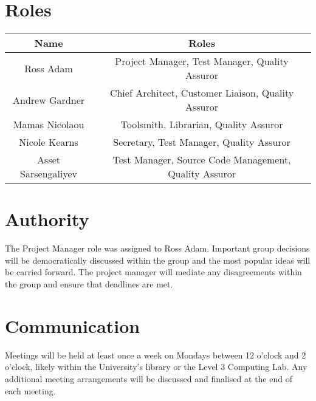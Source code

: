\documentclass{l3deliverable}
\begin{document}
{%

\section{Roles}

\begin{center}{
\begin{tabular}{|c|c|}
\hline \textbf{Name} &\textbf{Roles}\\ 
\hline Ross Adam & Project Manager, Test Manager, Quality Assuror\\ 
\hline Andrew Gardner & Chief Architect, Customer Liaison, Quality Assuror  \\ 
\hline Mamas Nicolaou & Toolsmith, Librarian, Quality Assuror\\ 
\hline Nicole Kearns & Secretary, Test Manager, Quality Assuror\\ 
\hline Asset Sarsengaliyev & Test Manager, Source Code Management, Quality Assuror \\
\hline 
\end{tabular} }
\end{center}

\section{Authority}

The Project Manager role was assigned to Ross Adam. Important group decisions will be democratically discussed within the group and the most popular ideas will be carried forward. The project manager will mediate any disagreements within the group and ensure that deadlines are met.

\section{Communication}

Meetings will be held at least once a week on Mondays between 12 o'clock and 2 o'clock, likely within the University’s library or the Level 3 Computing
Lab. Any additional meeting arrangements will be discussed and finalised at the end of each meeting.



}
\end{document}
